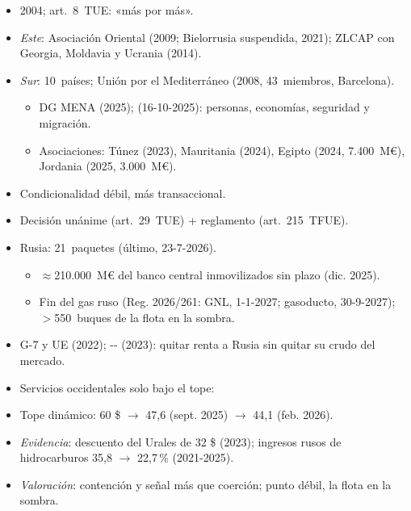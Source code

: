 \documentclass{article}
\begin{document}
\begin{columnas}
\begin{itemize}
\item 2004; art.~8~TUE: «más por más».
\item \emph{Este}: Asociación Oriental (2009; Bielorrusia suspendida, 2021); ZLCAP con Georgia, Moldavia y Ucrania (2014).
\item \emph{Sur}: 10~países; Unión por el Mediterráneo (2008, 43~miembros, Barcelona).
  \begin{itemize}
  \item DG MENA (2025);  (16-10-2025): personas, economías, seguridad y migración.
  \item Asociaciones: Túnez (2023), Mauritania (2024), Egipto (2024, 7.400~M€), Jordania (2025, 3.000~M€).
  \end{itemize}
\item Condicionalidad débil, más transaccional.
\end{itemize}
\begin{itemize}
\item Decisión unánime (art.~29~TUE) + reglamento (art.~215~TFUE).
\item Rusia: 21~paquetes (último, 23-7-2026).
  \begin{itemize}
  \item $\approx$210.000~M€ del banco central inmovilizados sin plazo (dic. 2025).
  \item Fin del gas ruso (Reg. 2026/261: GNL, 1-1-2027; gasoducto, 30-9-2027); $>$550~buques de la flota en la sombra.
  \end{itemize}
\end{itemize}
\begin{itemize}
\item G-7 y UE (2022); -- (2023): quitar renta a Rusia sin quitar su crudo del mercado.
\item Servicios occidentales solo bajo el tope:
\item Tope dinámico: 60 \$ $\to$ 47,6 (sept. 2025) $\to$ 44,1 (feb. 2026).
\item \emph{Evidencia}: descuento del Urales de 32 \$ (2023); ingresos rusos de hidrocarburos 35,8 $\to$ 22,7\,\% (2021-2025).
\item \emph{Valoración}: contención y señal más que coerción; punto débil, la flota en la sombra.
\end{itemize}


\end{columnas}
\end{document}
